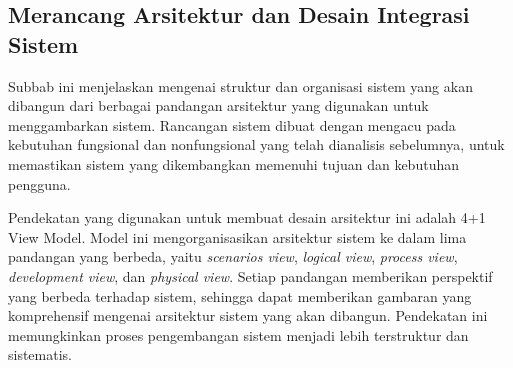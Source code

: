 \subsection{Merancang Arsitektur dan Desain Integrasi Sistem}
\label{subsec:merancang-aristektur-dan-desain-integrasi-sistem}

Subbab ini menjelaskan mengenai struktur dan organisasi sistem yang akan dibangun dari berbagai pandangan arsitektur yang digunakan untuk menggambarkan sistem. Rancangan sistem dibuat dengan mengacu pada kebutuhan fungsional dan nonfungsional yang telah 
dianalisis sebelumnya, untuk memastikan sistem yang dikembangkan memenuhi tujuan dan kebutuhan pengguna.

Pendekatan yang digunakan untuk membuat desain arsitektur ini adalah 4+1 View Model. Model ini mengorganisasikan arsitektur sistem ke dalam lima pandangan yang berbeda, yaitu \emph{scenarios view}, \emph{logical view}, \emph{process view}, \emph{development view}, dan \emph{physical view}. Setiap pandangan memberikan perspektif yang berbeda terhadap sistem, sehingga dapat memberikan gambaran yang komprehensif mengenai arsitektur sistem yang akan dibangun. Pendekatan ini memungkinkan proses pengembangan sistem menjadi lebih terstruktur dan sistematis.









